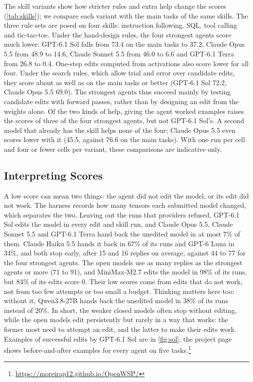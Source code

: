 \documentclass[11pt]{article}
\begin{document}
The skill variants show how stricter rules and extra help change the scores (\cref{tab:skills});
we compare each variant with the main tasks of the same skills. The three rule sets are posed on
four skills: instruction following, SQL, tool calling and tic-tac-toe. Under the hand-design
rules, the four strongest agents score much lower: GPT-6.1 Sol falls from 73.4 on the main tasks
to 37.2, Claude Opus 5.5 from 48.9 to 14.6, Claude Sonnet 5.5 from 46.0 to 6.6 and GPT-6.1 Terra
from 26.8 to 0.4. One-step edits computed from activations also score lower for all four. Under
the search rules, which allow trial and error over candidate edits, they score about as well as
on the main tasks or better (GPT-6.1 Sol 72.2, Claude Opus 5.5 69.0). The strongest agents thus
succeed mainly by testing candidate edits with forward passes, rather than by designing an edit
from the weights alone. Of the two kinds of help, giving the agent worked examples raises the
scores of three of the four strongest agents, but not GPT-6.1 Sol's. A second model that already has the skill helps none of the four; Claude Opus 5.5 even
scores lower with it (45.5, against 76.6 on the main tasks). With one run per cell and four or
fewer cells per variant, these comparisons are indicative only.

\subsection{Interpreting Scores}\label{sec:analysis}
{  %
A low score can mean two things: the agent did not edit the model, or its edit did not work. The
harness records how many tensors each submitted model changed, which separates the two. Leaving
out the runs that providers refused, GPT-6.1 Sol edits the model in every edit and skill run, and
Claude Opus 5.5, Claude Sonnet 5.5 and GPT-6.1 Terra hand back the unedited model in at most 7\%
of them. Claude Haiku 5.5 hands it back in 67\% of its runs and GPT-6 Luna in 34\%, and both stop
early, after 15 and 16 replies on average, against 44 to 77 for the four strongest agents. The open
models use as many replies as the strongest agents or more (71 to 91), and MiniMax-M2.7 edits the
model in 98\% of its runs, but 84\% of its edits score 0. Their low scores come from edits that do
not work, not from too few attempts or too small a budget. Thinking matters here too: without it,
Qwen3.8-27B hands back the unedited model in 38\% of its runs instead of 20\%. In short, the weaker closed models
often stop without editing, while the open models edit persistently but rarely in a way that
works: the former most need to attempt an edit, and the latter to make their edits work.
Examples of successful edits by GPT-6.1 Sol are in \cref{fig:sol}; the project page shows before-and-after
examples for every agent on five tasks.\footnote{\url{https://moreirap12.github.io/OpenWSP/}}\par}
\end{document}
